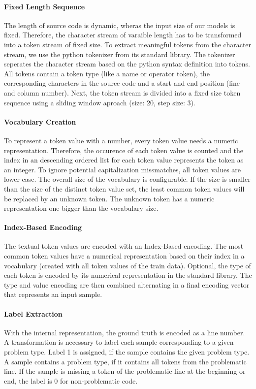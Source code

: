 \paragraph{Fixed Length Sequence}
The length of source code is dynamic, wheras the input size of our models is fixed. Therefore, the character stream of varaible length has to be transformed into a token stream of fixed size. 
To extract meaningful tokens from the character stream, we use the python tokenizer from its standard library. The tokenizer seperates the character stream based on the python syntax definition into tokens. All tokens contain a token type (like a name or operator token), the corresponding characters in the source code and a start and end position (line and column number). Next, the token stream is divided into a fixed size token sequence using a sliding window aproach (size: 20, step size: 3).
\paragraph{Vocabulary Creation}
To represent a token value with a number, every token value needs a numeric representation. Therefore, the occurence of each token value is counted and the index in an descending ordered list for each token value represents the token as an integer. To ignore potential capitalization missmatches, all token values are lower-case. The overall size of the vocabulary is configurable. If the size is smaller than the size of the distinct token value set, the least common token values will be replaced by an unknown token. The unknown token has a numeric representation one bigger than the vocabulary size.
\paragraph{Index-Based Encoding}
The textual token values are encoded with an Index-Based encoding. The most common token values have a numerical representation based on their index in a vocabulary (created with all token values of the train data). Optional, the type of each token is encoded by its numerical representation in the standard library. The type and value encoding are then combined alternating in a final encoding vector that represents an input sample.
\paragraph{Label Extraction}
With the internal representation, the ground truth is encoded as a line number. A transformation is necessary to label each sample corresponding to a given problem type. Label 1 is assigned, if the sample contains the given problem type. A sample contains a problem type, if it contains all tokens from the problematic line. If the sample is missing a token of the problematic line at the beginning or end, the label is 0 for non-problematic code. 

